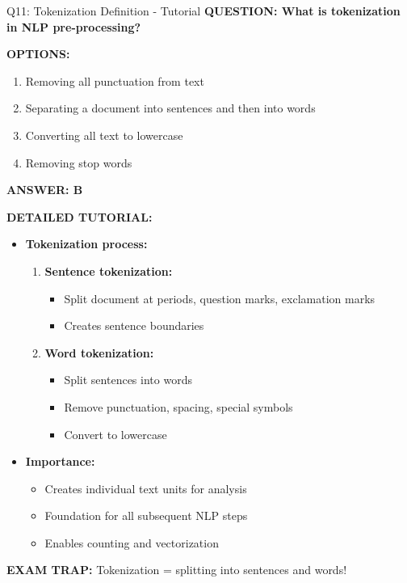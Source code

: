 \documentclass[8pt]{beamer}
\begin{document}
	
	\begin{frame}{Q11: Tokenization Definition - Tutorial}
		\fontsize{6.5}{7.5}\selectfont
		\textbf{QUESTION: What is tokenization in NLP pre-processing?}
		
		\vspace{0.1cm}
		\textbf{OPTIONS:}
		\begin{enumerate}
			\item Removing all punctuation from text
			\item Separating a document into sentences and then into words
			\item Converting all text to lowercase
			\item Removing stop words
		\end{enumerate}
		
		\vspace{0.1cm}
		\textcolor{myblue}{\textbf{ANSWER: B}}
		
		\vspace{0.1cm}
		\textbf{DETAILED TUTORIAL:}
		\begin{itemize}
			\item \textbf{Tokenization process:}
			\begin{enumerate}
				\item \textbf{Sentence tokenization:}
				\begin{itemize}
					\item Split document at periods, question marks, exclamation marks
					\item Creates sentence boundaries
				\end{itemize}
				\item \textbf{Word tokenization:}
				\begin{itemize}
					\item Split sentences into words
					\item Remove punctuation, spacing, special symbols
					\item Convert to lowercase
				\end{itemize}
			\end{enumerate}
			\item \textbf{Importance:}
			\begin{itemize}
				\item Creates individual text units for analysis
				\item Foundation for all subsequent NLP steps
				\item Enables counting and vectorization
			\end{itemize}
		\end{itemize}
		
		\textcolor{myred}{\textbf{EXAM TRAP:}} Tokenization = \textcolor{myblue}{splitting into sentences and words}!
	\end{frame}
	
\end{document}
